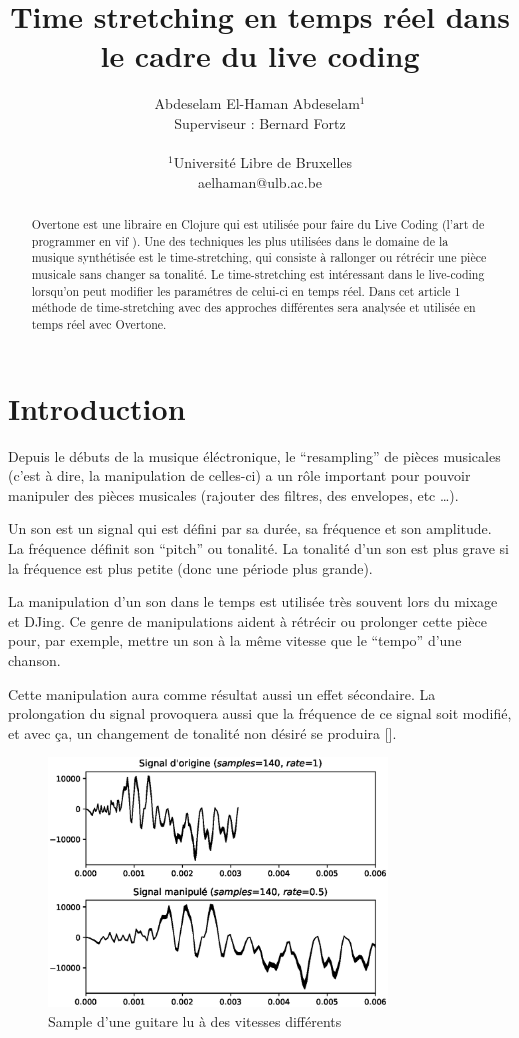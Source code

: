 \documentclass[letterpaper]{article}
\title{Time stretching en temps réel dans le cadre du live coding}
\author{Abdeselam El-Haman Abdeselam$^{1}$\\
Superviseur : Bernard Fortz
\mbox{}\\\\
$^1$Université Libre de Bruxelles \\
aelhaman@ulb.ac.be}
\begin{document}
\maketitle

\begin{abstract}
  Overtone est une libraire en Clojure qui est utilisée pour faire du
  Live Coding (l'art de programmer en \og vif \fg{}). Une des techniques les
  plus utilisées dans le domaine de la musique synthétisée est le
  time-stretching, qui consiste à rallonger ou rétrécir une pièce musicale
  sans changer sa tonalité. Le time-stretching est intéressant dans
  le live-coding lorsqu'on peut modifier les paramétres de celui-ci
  en temps réel. Dans cet article 1 méthode de time-stretching avec des
  approches différentes sera analysée et utilisée en temps
  réel avec Overtone.

\end{abstract}

\section{Introduction}

  Depuis le débuts de la musique éléctronique, le ``resampling'' de pièces musicales
  (c'est à dire, la manipulation de celles-ci) a un rôle important pour pouvoir manipuler
  des pièces musicales (rajouter des filtres, des envelopes, etc \ldots ).

  Un son est un signal qui est défini par sa durée, sa fréquence et son amplitude. La fréquence
  définit son ``pitch'' ou tonalité. La tonalité d'un son est plus grave si la fréquence est plus
  petite (donc une période plus grande).
  
  La manipulation d'un son dans le temps est utilisée très souvent lors du mixage et DJing.
  Ce genre de manipulations aident à rétrécir ou prolonger cette pièce pour, par exemple, mettre
  un son à la même vitesse que le ``tempo'' d'une chanson.

  Cette manipulation aura comme résultat aussi un effet sécondaire. La prolongation du signal
  provoquera aussi que la fréquence de ce signal soit modifié, et avec ça, un changement
  de tonalité non désiré se produira [\cite{RESAMPLING}].

  \begin{figure}[h]
    \centerline{\includegraphics[width=9cm]{res/fig1.eps}}
    \caption{\label{fig:guitar-stretch}Sample d'une guitare lu à des vitesses différents}
  \end{figure}
  
\end{document}
